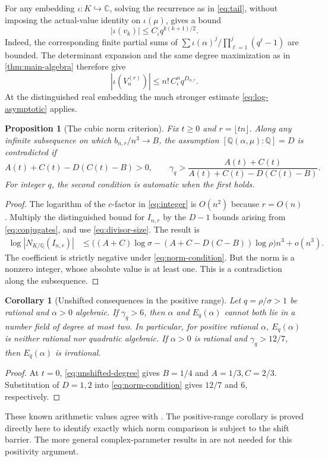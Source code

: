 \documentclass[11pt]{article}
\numberwithin{equation}{section}
\newtheorem{proposition}[proposition]{Proposition}
\newtheorem{corollary}[corollary]{Corollary}
\theoremstyle{definition}
\theoremstyle{remark}
\newcommand{\Q}{\mathbb{Q}}
\newcommand{\C}{\mathbb{C}}
\begin{document}
For any embedding $\iota:K\hookrightarrow\C$, solving the recurrence as in
\eqref{eq:tail}, without imposing the actual-value identity on
$\iota(\mu)$, gives a bound
\[
 |\iota(v_k)|\le C_\iota q^{k(k+1)/2}.
\]
Indeed, the corresponding finite partial sums of
$\sum\iota(\alpha)^j/\prod_{\ell=1}^j(q^\ell-1)$ are bounded.
The determinant expansion and the same degree maximization as in
\cref{thm:main-algebra} therefore give
\begin{equation}\label{eq:conjugates}
 |\iota(V_n^{(r)})|\le n!\,C_\iota^n q^{D_{n,r}}.
\end{equation}
At the distinguished real embedding the much stronger estimate
\eqref{eq:log-asymptotic} applies.

\begin{proposition}[The cubic norm criterion]\label{prop:norm}
Fix $t\ge0$ and $r=\lfloor tn\rfloor$. Along any infinite subsequence on
which $b_{n,r}/n^3\to B$, the assumption $[\Q(\alpha,\mu):\Q]=D$ is
contradicted if
\begin{equation}\label{eq:norm-condition}
 A(t)+C(t)-D(C(t)-B)>0,
 \qquad
 \gamma_q>\frac{A(t)+C(t)}{A(t)+C(t)-D(C(t)-B)}.
\end{equation}
For integer $q$, the second condition is automatic when the first holds.
\end{proposition}
\begin{proof}
The logarithm of the $c$-factor in \eqref{eq:integer} is $O(n^2)$ because
$r=O(n)$. Multiply the distinguished bound for $I_{n,r}$ by the
$D-1$ bounds arising from \eqref{eq:conjugates}, and use
\eqref{eq:divisor-size}. The result is
\begin{align}\label{eq:norm-exponent}
 \log|N_{K/\Q}(I_{n,r})|
 &\le\bigl((A+C)\log\sigma
       -(A+C-D(C-B))\log\rho\bigr)n^3+o(n^3).
\end{align}
The coefficient is strictly negative under \eqref{eq:norm-condition}.
But the norm is a nonzero integer, whose absolute value is at least one.
This is a contradiction along the subsequence.
\end{proof}

\begin{corollary}[Unshifted consequences in the positive range]\label{cor:arithmetic}
Let $q=\rho/\sigma>1$ be rational and $\alpha>0$ algebraic.
If $\gamma_q>6$, then $\alpha$ and $E_q(\alpha)$ cannot both lie in a
number field of degree at most two. In particular, for positive rational
$\alpha$, $E_q(\alpha)$ is neither rational nor quadratic algebraic.
If $\alpha>0$ is rational and $\gamma_q>12/7$, then $E_q(\alpha)$ is
irrational.
\end{corollary}
\begin{proof}
At $t=0$, \eqref{eq:unshifted-degree} gives $B=1/4$ and
$A=1/3,C=2/3$. Substitution of $D=1,2$ into
\eqref{eq:norm-condition} gives $12/7$ and $6$, respectively.
\end{proof}
These known arithmetic values agree with \cite[Corollary 1.1]{Rochev2011}.
The positive-range corollary is proved directly here to identify exactly
which norm comparison is subject to the shift barrier. The more general
complex-parameter results in \cite{KRVZ,Rochev2011} are not needed for
this positivity argument.
\end{document}

